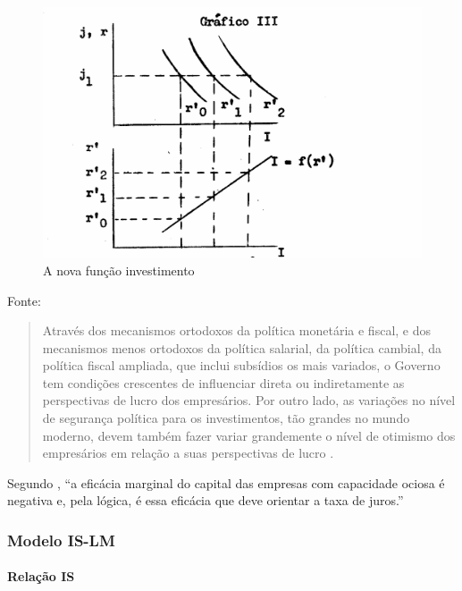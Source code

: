 \documentclass[]{article}
\let\oldparagraph\paragraph
\renewcommand{\paragraph}[1]{\oldparagraph{#1}\mbox{}}
\begin{document}
\begin{figure}
\centering
\includegraphics{imagens/imagem_final.png}
\caption{A nova função investimento}\label{eficienciamarginal2}
\end{figure}

Fonte: \cite{Bresser-Pereira1973}

\begin{quote}
Através dos mecanismos ortodoxos da política monetária e fiscal, e dos
mecanismos menos ortodoxos da política salarial, da política cambial, da
política fiscal ampliada, que inclui subsídios os mais variados, o
Governo tem condições crescentes de influenciar direta ou indiretamente
as perspectivas de lucro dos empresários. Por outro lado, as variações
no nível de segurança política para os investimentos, tão grandes no
mundo moderno, devem também fazer variar grandemente o nível de otimismo
dos empresários em relação a suas perspectivas de lucro
\cite[p.~9]{Bresser-Pereira1973}.
\end{quote}

Segundo , ``a eficácia marginal do
capital das empresas com capacidade ociosa é negativa e, pela lógica, é
essa eficácia que deve orientar a taxa de juros.''

\subsubsection{Modelo IS-LM}\label{modelo-is-lm}

\paragraph{Relação IS}\label{relacao-is}
\end{document}
